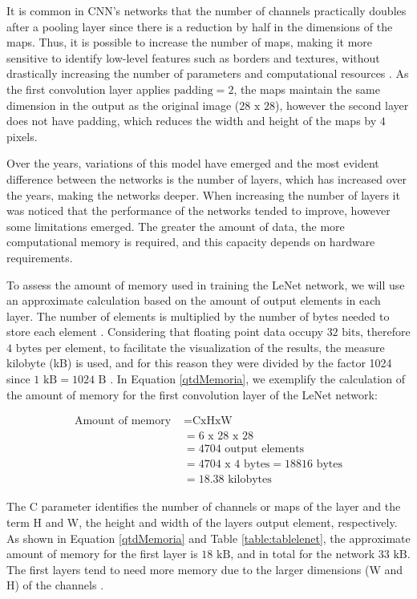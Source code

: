 It is common in CNN's networks that the number of channels practically doubles after a pooling layer since there is a reduction by half in the dimensions of the maps. Thus, it is possible to increase the number of maps, making it more sensitive to identify low-level features such as borders and textures, without drastically increasing the number of parameters and computational resources \cite{zhang2020dive}. As the first convolution layer applies  $\text{padding}=2$, the maps maintain the same dimension in the output as the original image ($28 \text{ x } 28$), however the second layer does not have padding, which reduces the width and height of the maps by $4$ pixels.

Over the years, variations of this model have emerged and the most evident difference between the networks is the number of layers, which has increased over the years, making the networks deeper. When increasing the number of layers it was noticed that the performance of the networks tended to improve, however some limitations emerged. The greater the amount of data, the more computational memory is required, and this capacity depends on hardware requirements.

To assess the amount of memory used in training the LeNet network, we will use an approximate calculation based on the amount of output elements in each layer. The number of elements is multiplied by the number of bytes needed to store each element \cite{johnson2019}. Considering that floating point data occupy $32 \text{ bits}$, therefore  $4 \text{ bytes}$ per element, to facilitate the visualization of the results, the measure kilobyte (kB) is used, and for this reason they were divided by the factor 1024 since  $1 \text{ kB} = 1024 \text{ B}$ . In Equation \ref{qtdMemoria}, we exemplify the calculation of the amount of memory for the first convolution layer of the LeNet network:


\begin{equation}
\begin{split}
\text{Amount of memory }& = \text{CxHxW}\\ 
&= 6 \text{ x } 28 \text{ x } 28\\
&= 4704 \text{ output elements}\\
&= 4704 \text{ x }4 \text{ bytes} = 18816 \text{ bytes}\\
&= 18.38 \text{ kilobytes}
\end{split}
\label{qtdMemoria}
\end{equation}

The C parameter identifies the number of channels or maps of the layer and the term H and W, the height and width of the layers output element, respectively. As shown in Equation \ref{qtdMemoria} and Table \ref{table:tablelenet}, the approximate amount of memory for the first layer is $18 \text{ kB}$, and in total for the network $33 \text{ kB}$. The first layers tend to need more memory due to the larger dimensions (W and H) of the channels \cite{johnson2019}.


